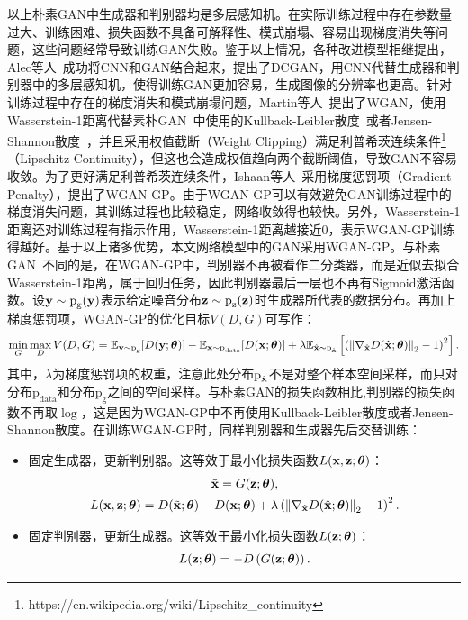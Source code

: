 以上朴素GAN中生成器和判别器均是多层感知机。在实际训练过程中存在参数量过大、训练困难、损失函数不具备可解释性、模式崩塌、容易出现梯度消失等问题，这些问题经常导致训练GAN失败。鉴于以上情况，各种改进模型相继提出，Alec等人~\cite{radford2015unsupervised}成功将CNN和GAN结合起来，提出了DCGAN，用CNN代替生成器和判别器中的多层感知机，使得训练GAN更加容易，生成图像的分辨率也更高。针对训练过程中存在的梯度消失和模式崩塌问题，Martin等人~\cite{arjovsky2017wasserstein}提出了WGAN，使用Wasserstein-1距离代替素朴GAN~\cite{goodfellow2014generative}中使用的Kullback-Leibler散度~\cite{Kullback1951ONIA}或者Jensen-Shannon散度~\cite{Kantor2001FoundationsOS}，并且采用权值截断（Weight Clipping）满足利普希茨连续条件\footnote{https://en.wikipedia.org/wiki/Lipschitz\_continuity}（Lipschitz Continuity），但这也会造成权值趋向两个截断阈值，导致GAN不容易收敛。为了更好满足利普希茨连续条件，Ishaan等人~\cite{gulrajani2017improved}采用梯度惩罚项（Gradient Penalty），提出了WGAN-GP。由于WGAN-GP可以有效避免GAN训练过程中的梯度消失问题，其训练过程也比较稳定，网络收敛得也较快。另外，Wasserstein-1距离还对训练过程有指示作用，Wasserstein-1距离越接近0，表示WGAN-GP训练得越好。基于以上诸多优势，本文网络模型中的GAN采用WGAN-GP。与朴素GAN~\cite{goodfellow2014generative}不同的是，在WGAN-GP中，判别器不再被看作二分类器，而是近似去拟合Wasserstein-1距离，属于回归任务，因此判别器最后一层也不再有Sigmoid激活函数。设$\mathbf{y}\sim \text{p}_\text{g}(\mathbf{y})$表示给定噪音分布$\mathbf{z}\sim \text{p}_{\text{z}}(\mathbf{z})$时生成器所代表的数据分布。再加上梯度惩罚项，WGAN-GP的优化目标$V(D, G)$可写作：
\begin{equation*}\label{wgan_gp_loss_func}
\min _{G} \max _{D} V(D, G)=\mathbb{E}_{\mathbf{y} \sim \text{p}_{\text{g}}}[D(\mathbf{y};\mbox{\boldmath $\theta$})]-\mathbb{E}_{\mathbf{x} \sim \text{p}_{\text{data}}}[D(\mathbf{x};\mbox{\boldmath $\theta$})]+\lambda \mathbb{E}_{\hat{\mathbf{x}} \sim \text{p}_{\hat{\mathbf{x}}}}\left[\left(\left\|\nabla_{\hat{\mathbf{x}}}D(\hat{\mathbf{x}};\mbox{\boldmath $\theta$})\right\|_{2}-1\right)^{2}\right].
\end{equation*}
其中，$\lambda$为梯度惩罚项的权重，注意此处分布$\text{p}_{\hat{\mathbf{x}}}$不是对整个样本空间采样，而只对分布$\text{p}_{\text{data}}$和分布$\text{p}_{\text{g}}$之间的空间采样。与朴素GAN的损失函数相比,判别器的损失函数不再取$\log$，这是因为WGAN-GP中不再使用Kullback-Leibler散度或者Jensen-Shannon散度。在训练WGAN-GP时，同样判别器和生成器先后交替训练：
\begin{itemize}
	\item 固定生成器，更新判别器。这等效于最小化损失函数$L(\mathbf{x},\mathbf{z};\mbox{\boldmath $\theta$})$：
	\begin{gather*}
	\tilde{{\mathbf{x}}} = G({\mathbf{z}};\mbox{\boldmath $\theta$}), \\
	L(\mathbf{x},\mathbf{z};\mbox{\boldmath $\theta$})=D(\tilde{{\mathbf{x}}};\mbox{\boldmath $\theta$})-D({\mathbf{x}};\mbox{\boldmath $\theta$})+\lambda\left(\left\|\nabla_{\hat{\mathbf{x}}} D(\hat{\mathbf{x}};\mbox{\boldmath $\theta$})\right\|_{2}-1\right)^{2}.
	\end{gather*}
	\item 固定判别器，更新生成器。这等效于最小化损失函数$L(\mathbf{z};\mbox{\boldmath $\theta$})$：
	\begin{equation*}
	L(\mathbf{z};\mbox{\boldmath $\theta$})=-D\left(G(\mathbf{z};\mbox{\boldmath $\theta$})\right).
	\end{equation*}
\end{itemize}
